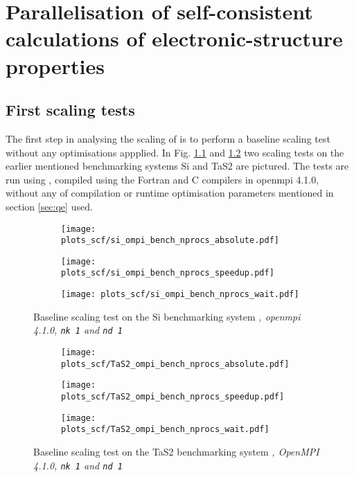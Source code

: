 \documentclass[main.tex]{subfiles}
\begin{document}
\chapter{Parallelisation of self-consistent calculations of electronic-structure properties\label{ch:optimisation_scf}}

\section{First scaling tests}

The first step in analysing the scaling of \QE is to perform a baseline scaling test without any optimisations appplied. 
In Fig. \ref{fig:scaling_ompi_nprocs_si} and \ref{fig:scaling_ompi_nprocs_tas2} two scaling tests on the earlier mentioned benchmarking systems Si and TaS2 are pictured. 
The tests are run using , compiled using the Fortran and C compilers in \gls{openmpi} 4.1.0, without any of compilation or runtime optimisation parameters mentioned in section \ref{sec:qe} used.

\begin{figure}[htbp]
\begin{subfigure}[b]{0.32\textwidth}
    \centering
    \texttt{[image: plots\_scf/si\_ompi\_bench\_nprocs\_absolute.pdf]}
\end{subfigure}
\begin{subfigure}[b]{0.32\textwidth}
    \centering
    \texttt{[image: plots\_scf/si\_ompi\_bench\_nprocs\_speedup.pdf]}
\end{subfigure}
\begin{subfigure}[b]{0.32\textwidth}
    \centering
    \texttt{[image: plots\_scf/si\_ompi\_bench\_nprocs\_wait.pdf]}
\end{subfigure}
\caption{Baseline scaling test on the Si benchmarking system \emph{, \gls{openmpi} 4.1.0, \texttt{nk 1} and \texttt{nd 1}}}
\label{fig:scaling_ompi_nprocs_si}
\end{figure}

\begin{figure}[h!]
\begin{subfigure}[b]{0.32\textwidth}
    \centering
    \texttt{[image: plots\_scf/TaS2\_ompi\_bench\_nprocs\_absolute.pdf]}
\end{subfigure}
\begin{subfigure}[b]{0.32\textwidth}
    \centering
    \texttt{[image: plots\_scf/TaS2\_ompi\_bench\_nprocs\_speedup.pdf]}
\end{subfigure}
\begin{subfigure}[b]{0.32\textwidth}
    \centering
    \texttt{[image: plots\_scf/TaS2\_ompi\_bench\_nprocs\_wait.pdf]}
\end{subfigure}
\caption{Baseline scaling test on the TaS2 benchmarking system \emph{, OpenMPI 4.1.0, \texttt{nk 1} and \texttt{nd 1}}}
\label{fig:scaling_ompi_nprocs_tas2}
\end{figure}
\end{document}
